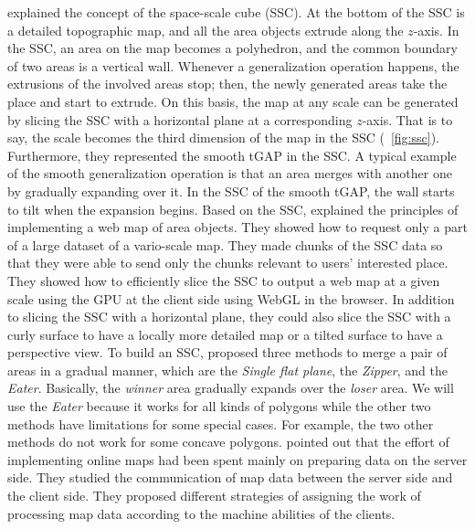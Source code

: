 \documentclass[]{interact}
\begin{document}
explained the concept of the space-scale cube (SSC).
At the bottom of the SSC is a detailed topographic map,
and all the area objects extrude along the $z$-axis.
In the SSC, an area on the map becomes a polyhedron, and
the common boundary of two areas is a vertical wall.
Whenever a generalization operation happens, 
the extrusions of the involved areas stop;
then, the newly generated areas take the place and start to extrude.
On this basis, the map at any scale can be generated by slicing the SSC 
with a horizontal plane at a corresponding $z$-axis.
That is to say, the scale becomes the third dimension of the map in the SSC
(\eg~\fig\ref{fig:ssc}).
Furthermore, they represented the smooth tGAP in the SSC.
A typical example of the smooth generalization operation is that 
an area merges with another one by gradually expanding over it.
In the SSC of the smooth tGAP, 
the wall starts to tilt when the expansion begins.
Based on the SSC, \citet{Meijers2020Web} explained the principles of 
implementing a web map of area objects.
They showed how to request only a part of a large dataset of a vario-scale map.
They made chunks of the SSC data
so that they were able to send only the chunks relevant 
to users' interested place.
They showed how to efficiently slice the SSC 
to output a web map at a given scale 
using the GPU at the client side using WebGL in the browser.
In addition to slicing the SSC with a horizontal plane,
they could also slice the SSC with a curly surface 
to have a locally more detailed map
or a tilted surface to have a perspective view.
To build an SSC, \citet{Suba2014Merge} proposed three methods 
to merge a pair of areas in a gradual manner, 
which are the \emph{Single flat plane}, 
the \emph{Zipper}, and the \emph{Eater}.
Basically, the \emph{winner} area gradually expands over the \emph{loser} area.
We will use the \emph{Eater} because it works for all kinds of polygons 
while the other two methods have limitations for some special cases.
For example, the two other methods do not work for some concave polygons.
\citet{Huang2016Webmap} pointed out that
the effort of implementing online maps 
had been spent mainly on preparing data on the server side.
They studied the communication of map data 
between the server side and the client side.
They proposed different strategies of assigning 
the work of processing map data
according to the machine abilities of the clients.
\end{document}
